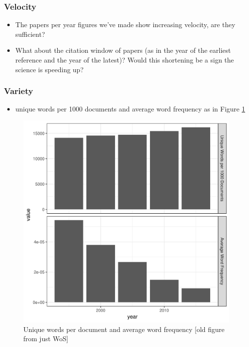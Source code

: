 \documentclass{article}
\begin{document}
\subsubsection*{Velocity}
\begin{itemize}
	\item The papers per year figures we've made show increasing velocity, are they sufficient?
    \item What about the citation window of papers (as in the year of the earliest reference and the year of the latest)? Would this shortening be a sign the science is speeding up?
\end{itemize}


\subsubsection*{Variety}

\begin{itemize}
	\item unique words per 1000 documents and average word frequency as in Figure \ref{variety}
\end{itemize}

\begin{figure}
\includegraphics[width=\linewidth]{plots/variety}
\caption{Unique words per document and average word frequency [old figure from just WoS]}
\label{variety}
\end{figure}
\end{document}
